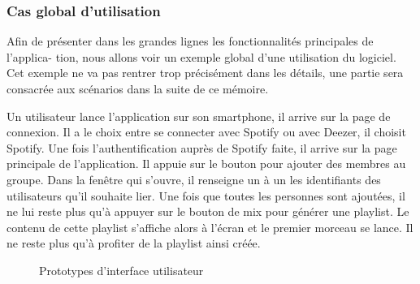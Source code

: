 \documentclass{article}
\begin{document}
        \subsubsection{Cas global d'utilisation}\label{interface_utilisateur}
        Afin de présenter dans les grandes lignes les fonctionnalités principales de l'applica- tion, nous allons voir un exemple global d'une utilisation du logiciel. Cet exemple ne va pas rentrer trop précisément dans les détails, une partie sera consacrée aux scénarios dans la suite de ce mémoire.
        
        Un utilisateur lance l'application sur son smartphone, il arrive sur la page de connexion. Il a le choix entre se connecter avec Spotify ou avec Deezer, il choisit Spotify. Une fois l'authentification auprès de Spotify faite, il arrive sur la page  principale de l'application. Il appuie sur le bouton pour ajouter des membres au groupe. Dans la fenêtre qui s'ouvre, il renseigne un à un les identifiants des utilisateurs qu'il souhaite lier. Une fois que toutes les personnes sont ajoutées, il ne lui reste plus qu'à appuyer sur le bouton de mix pour générer une playlist. Le contenu de cette playlist s'affiche alors à l'écran et le premier morceau se lance. Il ne reste plus qu'à profiter de la playlist ainsi créée.
                \newpage	

        		\begin{figure}[hb!]
			\centering
			\label{test}
			\caption{Prototypes d'interface utilisateur}
			\label{fig:gui}
		\end{figure}
        \newpage	
        
\end{document}
